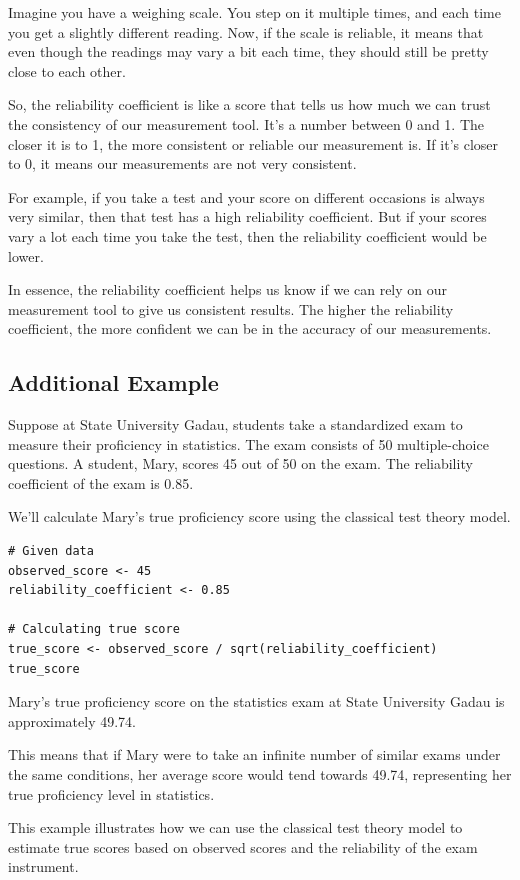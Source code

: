 \documentclass[12pt, a4paper]{exam}
\begin{document}
Imagine you have a weighing scale. You step on it multiple times, and each time you get a slightly different reading. Now, if the scale is reliable, it means that even though the readings may vary a bit each time, they should still be pretty close to each other.

So, the reliability coefficient is like a score that tells us how much we can trust the consistency of our measurement tool. It’s a number between 0 and 1. The closer it is to 1, the more consistent or reliable our measurement is. If it’s closer to 0, it means our measurements are not very consistent.

For example, if you take a test and your score on different occasions is always very similar, then that test has a high reliability coefficient. But if your scores vary a lot each time you take the test, then the reliability coefficient would be lower.

In essence, the reliability coefficient helps us know if we can rely on our measurement tool to give us consistent results. The higher the reliability coefficient, the more confident we can be in the accuracy of our measurements.

\subsection{Additional Example}

Suppose at State University Gadau, students take a standardized exam to measure their proficiency in statistics. The exam consists of 50 multiple-choice questions. A student, Mary, scores 45 out of 50 on the exam. The reliability coefficient of the exam is 0.85.

We’ll calculate Mary’s true proficiency score using the classical test theory model.

\begin{verbatim}
# Given data
observed_score <- 45
reliability_coefficient <- 0.85

# Calculating true score
true_score <- observed_score / sqrt(reliability_coefficient)
true_score
\end{verbatim}

Mary’s true proficiency score on the statistics exam at State University Gadau is approximately 49.74.

This means that if Mary were to take an infinite number of similar exams under the same conditions, her average score would tend towards 49.74, representing her true proficiency level in statistics.

This example illustrates how we can use the classical test theory model to estimate true scores based on observed scores and the reliability of the exam instrument.
\end{document}
